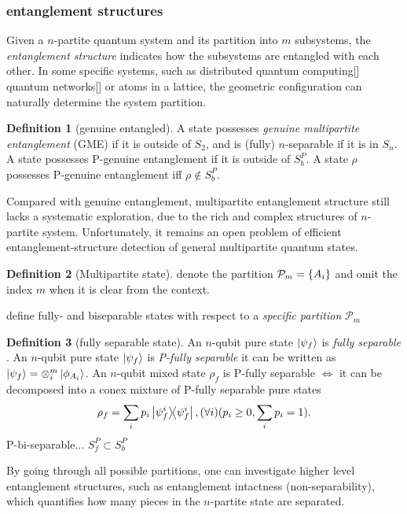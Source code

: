 \documentclass[
aps,
pra,
linenumbers,
floatfix,
]{revtex4-2}
\theoremstyle{plain}
\theoremstyle{definition}
\newtheorem{definition}{Definition}
\newtheorem{remark}{Remark}
\newcommand{\dm}{\rho}
\begin{document}
\subsubsection{entanglement structures}
Given a $n$-partite quantum system and its partition into $m$ subsystems, the \emph{entanglement structure} indicates how the subsystems are entangled with each other.
In some specific systems, such as distributed quantum computing[] quantum networks[] or atoms in a lattice, the geometric configuration can naturally determine the system partition.

\begin{definition}[genuine entangled]\label{def:genuinely_entangled}
	A state possesses \emph{genuine multipartite entanglement} (GME) if it is outside of $S_2$, and is (fully) $n$-separable if it is in $S_n$.
	A state possesses P-genuine entanglement if it is outside of $S_b^P$.
	A state $\dm$ possesses P-genuine entanglement iff $\dm\notin S_b^P$.
\end{definition}
	Compared with genuine entanglement, multipartite entanglement structure still lacks a systematic exploration, due to the rich and complex structures of $n$-partite system.
	Unfortunately, it remains an open problem of efficient entanglement-structure detection of general multipartite quantum states.
\begin{definition}[Multipartite state]
	denote the partition $\mathcal{P}_m = \qty{A_i}$
	and omit the index $m$ when it is clear from the context.
\end{definition}
define fully- and biseparable states with respect to a \emph{specific partition} $\mathcal{P}_m$
\begin{definition}[fully separable state]\label{def:fully_separable}
	An $n$-qubit pure state $\ket{\psi_f}$ is \emph{fully separable} \iff .
	An $n$-qubit pure state $\ket{\psi_f}$ is \emph{P-fully separable} \iff it can be written as 
	$\ket{\psi_f}=\otimes_i^m \ket{\phi_{A_i}}$.
	An $n$-qubit mixed state $\dm_f$ is P-fully separable $\iff$ it can be decomposed into a conex mixture of P-fully separable pure states 
	\begin{equation}
		\dm_f = \sum_i p_i \op{\psi_f^i}, (\forall i) ( p_i\ge 0, \sum_i p_i = 1) .
	\end{equation}
	P-bi-separable... $S_f^P \subset S_b^P$
\end{definition}
By going through all possible partitions, one can investigate higher level entanglement structures, such as entanglement intactness (non-separability), which quantifies how many pieces in the $n$-partite state are separated.
\end{document}
